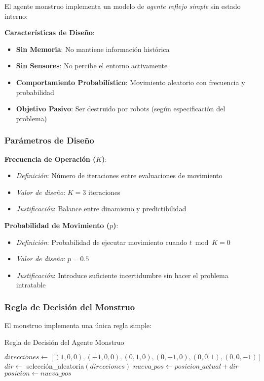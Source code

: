 \documentclass[10pt,twocolumn]{article}
\begin{document}
El agente monstruo implementa un modelo de \textit{agente reflejo simple} sin estado interno:

\textbf{Características de Diseño}:
\begin{itemize}
\item \textbf{Sin Memoria}: No mantiene información histórica
\item \textbf{Sin Sensores}: No percibe el entorno activamente
\item \textbf{Comportamiento Probabilístico}: Movimiento aleatorio con frecuencia y probabilidad
\item \textbf{Objetivo Pasivo}: Ser destruido por robots (según especificación del problema)
\end{itemize}

\subsubsection{Parámetros de Diseño}

\textbf{Frecuencia de Operación ($K$)}:
\begin{itemize}
\item \textit{Definición}: Número de iteraciones entre evaluaciones de movimiento
\item \textit{Valor de diseño}: $K = 3$ iteraciones
\item \textit{Justificación}: Balance entre dinamismo y predictibilidad
\end{itemize}

\textbf{Probabilidad de Movimiento ($p$)}:
\begin{itemize}
\item \textit{Definición}: Probabilidad de ejecutar movimiento cuando $t \bmod K = 0$
\item \textit{Valor de diseño}: $p = 0.5$
\item \textit{Justificación}: Introduce suficiente incertidumbre sin hacer el problema intratable
\end{itemize}

\subsubsection{Regla de Decisión del Monstruo}

El monstruo implementa una única regla simple:

\begin{algorithm}
\caption{Regla de Decisión del Agente Monstruo}
\begin{algorithmic}
        \STATE $direcciones \leftarrow [(1,0,0), (-1,0,0), (0,1,0), (0,-1,0), (0,0,1), (0,0,-1)]$
        \STATE $dir \leftarrow$ selección\_aleatoria$(direcciones)$
        \STATE $nueva\_pos \leftarrow posicion\_actual + dir$
            \STATE $posicion \leftarrow nueva\_pos$
        \ENDIF
    \ENDIF
\ENDIF
\end{algorithmic}
\end{algorithm}
\end{document}
